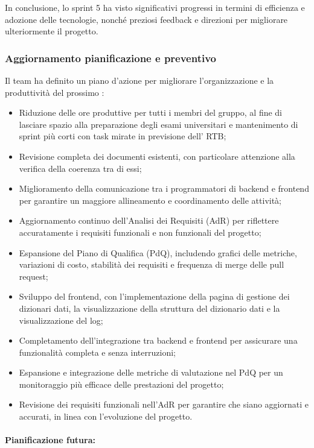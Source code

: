 In conclusione, lo sprint 5 ha visto significativi progressi in termini di efficienza e adozione delle tecnologie, nonché preziosi feedback e direzioni per migliorare ulteriormente il progetto.


\subsubsection{Aggiornamento pianificazione e preventivo}
\par Il team ha definito un piano d'azione per migliorare l'organizzazione e la produttività del prossimo :
\begin{itemize}
  \item Riduzione delle ore produttive per tutti i membri del gruppo, al fine di lasciare spazio alla preparazione degli esami universitari e mantenimento di sprint più corti con task mirate in previsione dell’ RTB;
  \item Revisione completa dei documenti esistenti, con particolare attenzione alla verifica della coerenza tra di essi;
  \item Miglioramento della comunicazione tra i programmatori di backend e frontend per garantire un maggiore allineamento e coordinamento delle attività;
  \item Aggiornamento continuo dell'Analisi dei Requisiti (AdR) per riflettere accuratamente i requisiti funzionali e non funzionali del progetto;
  \item Espansione del Piano di Qualifica (PdQ), includendo grafici delle metriche, variazioni di costo, stabilità dei requisiti e frequenza di merge delle pull request;
  \item Sviluppo del frontend, con l'implementazione della pagina di gestione dei dizionari dati, la visualizzazione della struttura del dizionario dati e la visualizzazione del log;
  \item Completamento dell'integrazione tra backend e frontend per assicurare una funzionalità completa e senza interruzioni;
  \item Espansione e integrazione delle metriche di valutazione nel PdQ per un monitoraggio più efficace delle prestazioni del progetto;
  \item Revisione dei requisiti funzionali nell'AdR per garantire che siano aggiornati e accurati, in linea con l'evoluzione del progetto.
\end{itemize}

\paragraph*{Pianificazione futura:}

